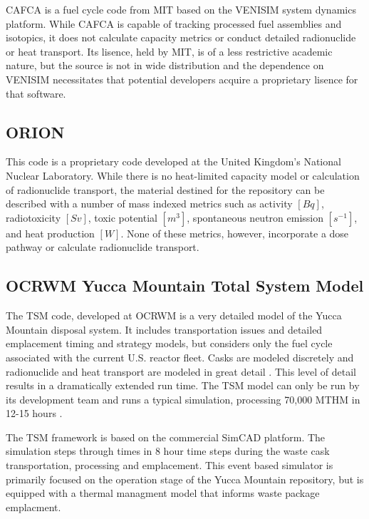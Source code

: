 \gls{CAFCA} is a fuel cycle code from \gls{MIT} based on the VENISIM system 
dynamics platform. While \gls{CAFCA} is 
capable of tracking processed fuel assemblies and isotopics, it does not 
calculate capacity metrics or conduct detailed radionuclide or heat transport. Its 
lisence, held by \gls{MIT}, is of a less restrictive academic nature, but the 
source is not in wide distribution and the dependence on VENISIM necessitates 
that potential developers acquire a proprietary lisence for that software. 

\subsection{ORION} 

This code is a proprietary code developed at the United
Kingdom's National Nuclear Laboratory. While there is no heat-limited capacity 
model or calculation of radionuclide transport, the material destined for the 
repository can be described with a number of mass indexed metrics such as activity 
$[Bq]$, radiotoxicity $[Sv]$,  toxic potential $[m^3]$, spontaneous neutron emission 
$[s^{-1}]$, and heat production $[W]$. None of these metrics, however, 
incorporate a dose pathway or calculate radionuclide transport. 



\subsection{OCRWM Yucca Mountain Total System Model}

The \gls{TSM} code, 
developed at \gls{OCRWM} is a very detailed model of the Yucca Mountain disposal 
system. It includes transportation issues and detailed emplacement timing and 
strategy models, but considers only the fuel cycle associated with the current  
U.S.  reactor fleet. Casks are modeled discretely and radionuclide and heat transport 
are modeled in great detail .  This level of detail 
results in a dramatically extended run time. The \gls{TSM} model can only be 
run by its development team and runs a typical simulation, processing 70,000 
MTHM in 12-15 hours \cite{turner_discrete_2010}. 

The TSM framework is based on the commercial SimCAD platform. The simulation 
steps through times in 8 hour time steps during the waste cask transportation, 
processing and emplacement. This event based simulator is primarily focused on 
the operation stage of the Yucca Mountain repository, but is equipped with a 
thermal managment model that informs waste package emplacment.






